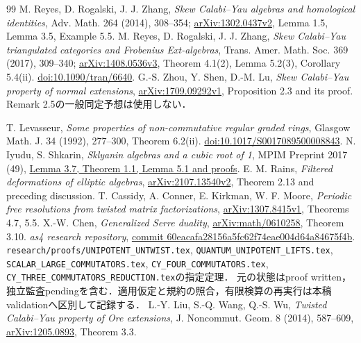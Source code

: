 \documentclass[11pt,a4paper]{ltjsarticle}
\theoremstyle{definition}\newtheorem{definition}[theorem]{定義}
\begin{document}
\begin{thebibliography}{99}
 M. Reyes, D. Rogalski, J. J. Zhang,
\emph{Skew Calabi--Yau algebras and homological identities},
Adv. Math. 264 (2014), 308--354;
\href{https://arxiv.org/abs/1302.0437}{arXiv:1302.0437v2}, Lemma 1.5, Lemma 3.5, Example 5.5.
 M. Reyes, D. Rogalski, J. J. Zhang,
\emph{Skew Calabi--Yau triangulated categories and Frobenius Ext-algebras},
Trans. Amer. Math. Soc. 369 (2017), 309--340;
\href{https://arxiv.org/abs/1408.0536}{arXiv:1408.0536v3}, Theorem 4.1(2), Lemma 5.2(3), Corollary 5.4(ii).
\href{https://doi.org/10.1090/tran/6640}{doi:10.1090/tran/6640}.
 G.-S. Zhou, Y. Shen, D.-M. Lu,
\emph{Skew Calabi--Yau property of normal extensions},
\href{https://arxiv.org/abs/1709.09292}{arXiv:1709.09292v1}, Proposition 2.3 and its proof.
Remark 2.5の一般同定予想は使用しない．

 T. Levasseur,
\emph{Some properties of non-commutative regular graded rings},
Glasgow Math. J. 34 (1992), 277--300, Theorem 6.2(ii).
\href{https://doi.org/10.1017/S0017089500008843}{doi:10.1017/S0017089500008843}.
 N. Iyudu, S. Shkarin,
\emph{Sklyanin algebras and a cubic root of 1}, MPIM Preprint 2017 (49),
\href{https://archive.mpim-bonn.mpg.de/id/eprint/997/1/preprint_2017_49.pdf}{Lemma 3.7, Theorem 1.1, Lemma 5.1 and proofs}.
 E. M. Rains, \emph{Filtered deformations of elliptic algebras},
\href{https://arxiv.org/abs/2107.13540v2}{arXiv:2107.13540v2}, Theorem 2.13 and preceding discussion.
 T. Cassidy, A. Conner, E. Kirkman, W. F. Moore,
\emph{Periodic free resolutions from twisted matrix factorizations},
\href{https://arxiv.org/abs/1307.8415v1}{arXiv:1307.8415v1}, Theorems 4.7, 5.5.
 X.-W. Chen, \emph{Generalized Serre duality},
\href{https://arxiv.org/abs/math/0610258}{arXiv:math/0610258}, Theorem 3.10.
 \emph{as4 research repository},
\href{https://github.com/uedakazushi/as4/tree/60eacafa28156a5fc62f74eae004d64a84675f4b}{commit 60eacafa28156a5fc62f74eae004d64a84675f4b}.
\texttt{research/proofs/UNIPOTENT\_UNTWIST.tex}, \texttt{QUANTUM\_UNIPOTENT\_LIFTS.tex},
\texttt{SCALAR\_LARGE\_COMMUTATORS.tex}, \texttt{CY\_FOUR\_COMMUTATORS.tex},
\texttt{CY\_THREE\_COMMUTATORS\_REDUCTION.tex}の指定定理．
元の状態はproof written，独立監査pendingを含む．適用仮定と規約の照合，有限検算の再実行は本稿validationへ区別して記録する．
 L.-Y. Liu, S.-Q. Wang, Q.-S. Wu,
\emph{Twisted Calabi--Yau property of Ore extensions},
J. Noncommut. Geom. 8 (2014), 587--609,
\href{https://arxiv.org/abs/1205.0893}{arXiv:1205.0893}, Theorem 3.3.

\end{thebibliography}
\end{document}
